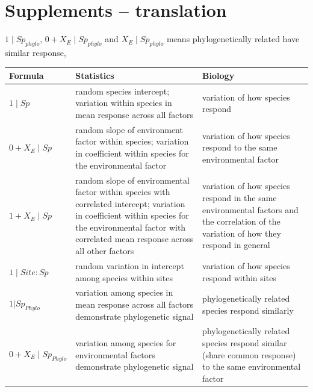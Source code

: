 \newpage

\section{Supplements -- translation}

$1 \mid Sp_{phylo}$, $0 + X_{E} \mid Sp_{phylo}$ and $X_{E} \mid Sp_{phylo}$ means phylogenetically related have similar response,   

\begin{tabularx}{\textwidth}{|l|X|X|}
\hline
Formula & Statistics & Biology \\
\hline
$1 \mid Sp$ &
random species intercept; variation within species in mean response across all factors &
variation of how species respond \\
\hline

$0 + X_{E} \mid Sp$ &
random slope of environment factor within species; variation in coefficient within species for the environmental factor &
variation of how species respond to the same environmental factor \\
\hline

$1 + X_{E} \mid Sp$ &
random slope of environmental factor within species with correlated intercept; variation in coefficient within species for the environmental factor with correlated mean response across all other factors &
variation of how species respond in the same environmental factors and the correlation of the variation of how they respond in general \\
\hline

$1 \mid Site:Sp $ &
random variation in intercept among species within sites &
variation of how species respond within sites \\
\hline

$1 | Sp_{Phylo} $ &
variation among species in mean response across all factors demonstrate phylogenetic signal &
phylogenetically related species respond similarly \\
\hline

$0 + X_{E} \mid Sp_{Phylo}$ &
variation among species for environmental factors demonstrate phylogenetic signal &
phylogenetically related species respond similar (share common response) to the same environmental factor \\
\hline
\end{tabularx}
            
                                                                        
